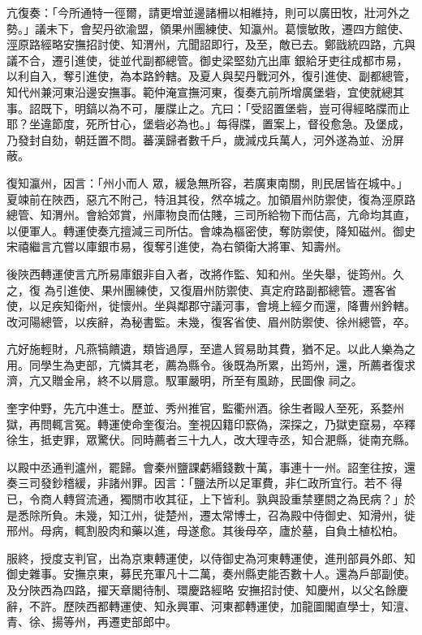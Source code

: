 \begin{pinyinscope}
 亢復奏：「今所通特一徑爾，請更增並邊諸柵以相維持，則可以廣田牧，壯河外之勢。」議未下，會契丹欲渝盟，領果州團練使、知瀛州。葛懷敏敗，遷四方館使、涇原路經略安撫招討使、知渭州，亢聞詔即行，及至，敵已去。鄭戩統四路，亢與議不合，遷引進使，徙並代副都總管。御史梁堅劾亢出庫
 銀給牙吏往成都市易，以利自入，奪引進使，為本路鈐轄。及夏人與契丹戰河外，復引進使、副都總管，知代州兼河東沿邊安撫事。範仲淹宣撫河東，復奏亢前所增廣堡砦，宜使就總其事。詔既下，明鎬以為不可，屢牒止之。亢曰：「受詔置堡砦，豈可得經略牒而止耶？坐違節度，死所甘心，堡砦必為也。」每得牒，置案上，督役愈急。及堡成，乃發封自劾，朝廷置不問。蕃漢歸者數千戶，歲減戍兵萬人，河外遂為並、汾屏蔽。



 復知瀛州，因言：「州小而人
 眾，緩急無所容，若廣東南關，則民居皆在城中。」夏竦前在陜西，惡亢不附己，特沮其役，然卒城之。加領眉州防禦使，復為涇原路總管、知渭州。會給郊賞，州庫物良而估賤，三司所給物下而估高，亢命均其直，以便軍人。轉運使奏亢擅減三司所估。會竦為樞密使，奪防禦使，降知磁州。御史宋禧繼言亢嘗以庫銀市易，復奪引進使，為右領衛大將軍、知壽州。



 後陜西轉運使言亢所易庫銀非自入者，改將作監、知和州。坐失舉，徙筠州。久之，復
 為引進使、果州團練使，又復眉州防禦使、真定府路副都總管。遷客省使，以足疾知衛州，徙懷州。坐與鄰郡守議河事，會境上經夕而還，降曹州鈐轄。改河陽總管，以疾辭，為秘書監。未幾，復客省使、眉州防禦使、徐州總管，卒。



 亢好施輕財，凡燕犒饋遺，類皆過厚，至遣人貿易助其費，猶不足。以此人樂為之用。同學生為吏部，亢憐其老，薦為縣令。後既為所累，出筠州，還，所薦者復求濟，亢又贈金帛，終不以屑意。馭軍嚴明，所至有風跡，民圖像
 祠之。



 奎字仲野，先亢中進士。歷並、秀州推官，監衢州酒。徐生者毆人至死，系婺州獄，再問輒言冤。轉運使命奎復治。奎視囚籍印窾偽，深探之，乃獄吏竄易，卒釋徐生，抵吏罪，眾驚伏。同時薦者三十九人，改大理寺丞，知合淝縣，徙南充縣。



 以殿中丞通判瀘州，罷歸。會秦州鹽課虧緡錢數十萬，事連十一州。詔奎往按，還奏三司發鈔稽緩，非諸州罪。因言：「鹽法所以足軍費，非仁政所宜行。若不
 得已，令商人轉貿流通，獨關市收其征，上下皆利。孰與設重禁壅閼之為民病？」於是悉除所負。未幾，知江州，徙楚州，遷太常博士，召為殿中侍御史、知滑州，徙邢州。母病，輒割股肉和藥以進，母遂愈。其後母卒，廬於墓，自負土植松柏。



 服終，授度支判官，出為京東轉運使，以侍御史為河東轉運使，進刑部員外郎、知御史雜事。安撫京東，募民充軍凡十二萬，奏州縣吏能否數十人。還為戶部副使。及分陜西為四路，擢天章閣待制、環慶路經略
 安撫招討使、知慶州，以父名餘慶辭，不許。歷陜西都轉運使、知永興軍、河東都轉運使，加龍圖閣直學士，知澶、青、徐、揚等州，再遷吏部郎中。




\end{pinyinscope}
